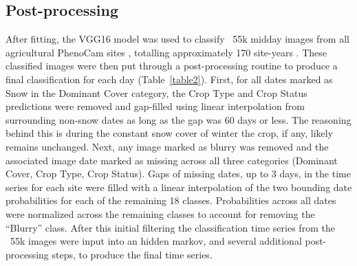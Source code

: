 \documentclass[remotesensing,article,submit,moreauthors,pdftex]{Definitions/mdpi}
\begin{document}
\subsection{Post-processing}

After fitting, the VGG16 model was used to classify ~55k midday images from all agricultural PhenoCam sites , totalling approximately 170 site-years \citep{milliman2019-phenocam}. These classified images were then put through a post-processing routine to produce a final classification for each day (Table~\ref{table2}). First, for all dates marked as Snow in the Dominant Cover category, the Crop Type and Crop Status predictions were removed and gap-filled using linear interpolation from surrounding non-snow dates as long as the gap was 60 days or less. The reasoning behind this is during the constant snow cover of winter the crop, if any, likely remains unchanged. Next, any image marked as blurry was removed and the associated image date marked as missing across all three categories (Dominant Cover, Crop Type, Crop Status). Gaps of missing dates, up to 3 days, in the time series for each site were filled with a linear interpolation of the two bounding date probabilities for each of the remaining 18 classes. Probabilities across all dates were normalized across the remaining classes to account for removing the “Blurry” class. After this initial filtering the classification time series from the ~55k images were input into an hidden markov, and several additional post-processing steps, to produce the final time series. 
\end{document}
